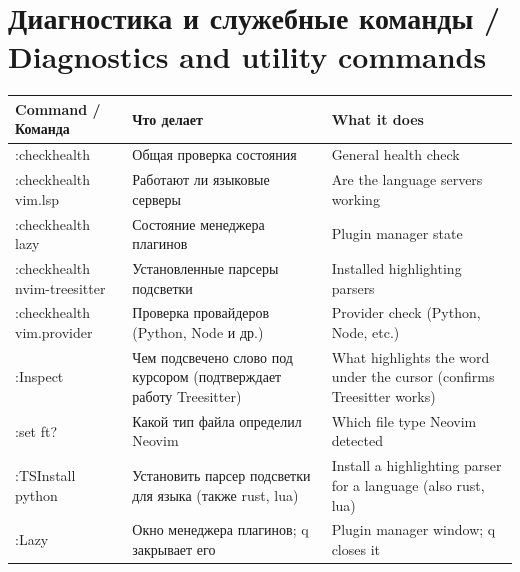 \documentclass[10pt]{article}
\newcommand{\hdr}[3]{\toprule \textbf{#1} & \textbf{#2} & \textbf{#3} \\ \midrule \endhead}
\begin{document}
\section*{Диагностика и служебные команды / Diagnostics and utility commands}
\begin{longtable}{@{}K A B@{}}
\hdr{Command / Команда}{Что делает}{What it does}
:checkhealth & Общая проверка состояния & General health check \\
:checkhealth vim.lsp & Работают ли языковые серверы & Are the language servers working \\
:checkhealth lazy & Состояние менеджера плагинов & Plugin manager state \\
:checkhealth nvim-treesitter & Установленные парсеры подсветки & Installed highlighting parsers \\
:checkhealth vim.provider & Проверка провайдеров (Python, Node и др.) & Provider check (Python, Node, etc.) \\
:Inspect & Чем подсвечено слово под курсором (подтверждает работу Treesitter) & What highlights the word under the cursor (confirms Treesitter works) \\
:set ft? & Какой тип файла определил Neovim & Which file type Neovim detected \\
:TSInstall python & Установить парсер подсветки для языка (также rust, lua) & Install a highlighting parser for a language (also rust, lua) \\
:Lazy & Окно менеджера плагинов; q закрывает его & Plugin manager window; q closes it \\
\end{longtable}
\end{document}

